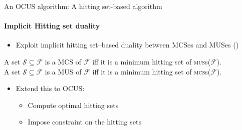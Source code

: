 \documentclass{beamer}
\newcommand\m[1]{\ensuremath{\mathcal{#1}}\xspace}
\newcommand\formula{\ensuremath{\m{F} }\xspace}
\renewcommand\emph[1]{{\color{vuborange}#1}}
\newcommand\subsetT{\m{\mathcal{S}}}
\newcommand\muses[1]{\textsc{mus}s(\m{#1})}
\newcommand\mcses[1]{\textsc{mcs}s(\m{#1})}
\begin{document}
%




\begin{frame}{An OCUS algorithm: A hitting set-based algorithm}
	\framesubtitle{Implicit Hitting set duality}
	
	\begin{itemize}
		\item[$\triangleright$] Exploit implicit hitting set--based duality between {\color{blue}MCSes} and {\color{teal}MUSes} (\cite{DBLP:journals/jar/LiffitonS08,ai/Reiter87})
	\end{itemize}\pause
	
	\begin{theorem}\label{prop:MCS-MUS-hittingset}
		A set  $\subsetT \subseteq \formula$ is a MCS of $ \formula$ iff  it is a \emph{minimum hitting set} of \muses{\formula}. \\
		A set  $\subsetT \subseteq \formula$ is a MUS of $ \formula$ iff  it is a \emph{minimum hitting set} of \mcses{\formula}.
	\end{theorem} \pause
	\begin{itemize}
		\item[$\triangleright$] Extend this to OCUS:
		\begin{itemize}	
			\item Compute \emph{optimal} hitting sets \pause
			\item Impose \emph{constraint} on the hitting sets
		\end{itemize}
	\end{itemize}
	
\end{frame}
\end{document}
